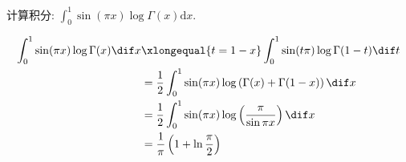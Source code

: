 \documentclass[color=green,titlestyle=hang]{elegantbook}%
\begin{document}

\begin{exercise}
计算积分: $\int_{0}^{1}\sin(\pi x)\log\Gamma(x)\mathrm{d}x$. 
\end{exercise}\begin{solution}
\begin{align*}
\int_{0}^{1}\sin(\pi x)\log\Gamma(x)\dif x
&\xlongequal{t=1-x}\int_{0}^{1}\sin( t\pi)\log\Gamma(1-t)\dif t\\
&=\frac{1}{2}\int_{0}^{1}\sin(\pi x)\log\left(\Gamma(x)+\Gamma(1-x)\right)\dif x\\
&=\frac{1}{2}\int_{0}^{1}\sin(\pi x)\log\left(\frac{\pi}{\sin\pi x}\right)\dif x\\
&=\frac{1}{\pi}\left(1+\ln\frac{\pi}{2}\right)
\end{align*}
\end{solution}
\end{document}
